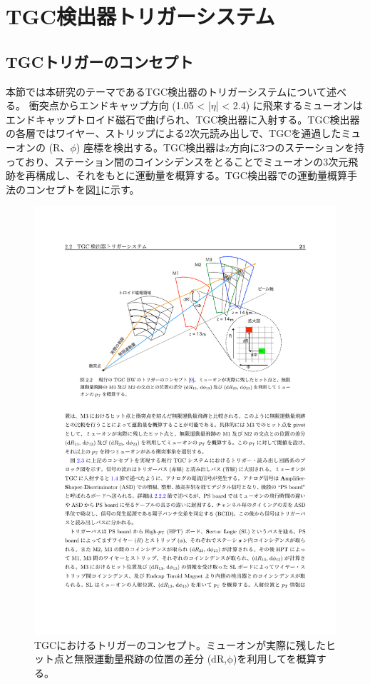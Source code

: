 \section{TGC検出器トリガーシステム}
\label{sec_TGCtrigger}

    \subsection{TGCトリガーのコンセプト}
    \label{subsec_trigger_concept}
本節では本研究のテーマであるTGC検出器のトリガーシステムについて述べる。
衝突点からエンドキャップ方向  (1.05 < |$\eta$| < 2.4) に飛来するミューオンはエンドキャップトロイド磁石で曲げられ、TGC検出器に入射する。TGC検出器の各層ではワイヤー、ストリップによる2次元読み出しで、TGCを通過したミューオンの  (R、$\phi$) 座標を検出する。TGC検出器はz方向に3つのステーションを持っており、ステーション間のコインシデンスをとることでミューオンの3次元飛跡を再構成し、それをもとに運動量を概算する。TGC検出器での運動量概算手法のコンセプトを図\ref{TGC_triggerconcept}に示す。

\begin{figure} 
\centering
\includegraphics[width=16cm]{fig/Intro/TGC_triggerconcept.pdf}
\caption[TGCにおけるトリガーのコンセプト]{TGCにおけるトリガーのコンセプト\cite{mt_akatsuka}。ミューオンが実際に残したヒット点と無限運動量飛跡の位置の差分 ($\mathrm{dR}$,$\mathrm{\phi}$)を利用して\pt を概算する。}
\label{TGC_triggerconcept}
\end{figure}

